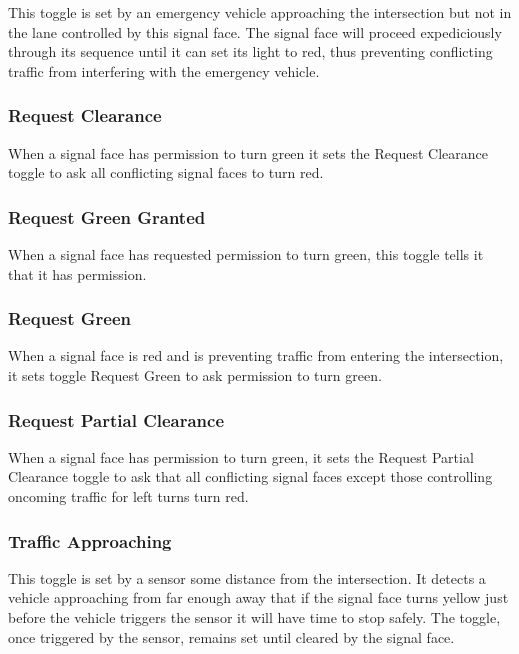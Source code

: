 \documentclass[letterpaper,twoside]{article}
\begin{document}
This toggle is set by an emergency vehicle approaching the intersection
but not in the lane controlled by this signal face.
The signal face will proceed expediciously through its sequence until it can
set its light to red, thus preventing
conflicting traffic from interfering with the emergency vehicle.

\subsubsection{Request Clearance}

When a signal face has permission to turn green it sets the Request Clearance
toggle to ask all conflicting signal faces to turn red.

\subsubsection{Request Green Granted}

When a signal face has requested permission to turn green, this toggle
tells it that it has permission.

\subsubsection{Request Green}

When a signal face is red and is preventing traffic from entering the
intersection, it sets toggle Request Green to ask permission to turn green.

\subsubsection{Request Partial Clearance}

When a signal face has permission to turn green, it sets the Request Partial
Clearance toggle to ask that all conflicting signal faces except
those controlling oncoming traffic for left turns turn red.

\subsubsection{Traffic Approaching}

This toggle is set by a sensor some distance from the intersection.
It detects a vehicle approaching from far enough away that if the
signal face turns yellow just before the vehicle triggers the sensor
it will have time to stop safely.
The toggle, once triggered by the sensor, remains set until cleared
by the signal face.
\end{document}
